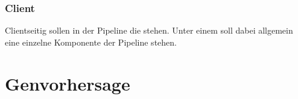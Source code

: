 \subsubsection{Client}
Clientseitig sollen in der Pipeline die  stehen.
Unter einem  soll dabei allgemein eine einzelne Komponente der
Pipeline stehen.

\section{Genvorhersage}






 
